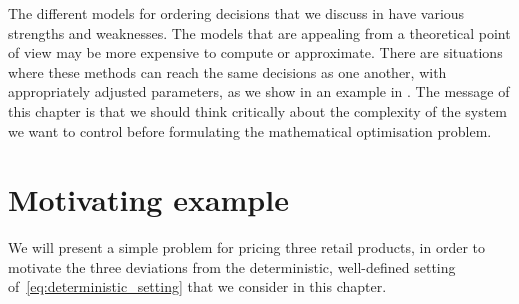 \documentclass[main.tex]{subfiles}
\begin{document}
The different models for ordering decisions that we discuss in
 have various strengths and
weaknesses. The models that are appealing
from a theoretical point of view may be more expensive to compute or
approximate. There are situations where these methods can reach the
same decisions as one another, with appropriately adjusted parameters, as we show in
an example in . The message of
this chapter is
that we should think critically about the complexity of the system we want
to control before formulating the mathematical optimisation problem.

\section{Motivating example}\label{sec:one_motivating_example}
We will present a simple problem for pricing three retail products, in
order to motivate the three deviations from
the deterministic, well-defined setting
of~\eqref{eq:deterministic_setting} that we consider in this chapter.
\end{document}
